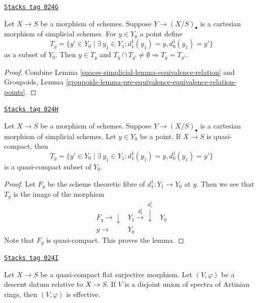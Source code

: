 \begin{lemma}
\label{spaces-simplicial-lemma-equivalence-classes-points}
\href{https://stacks.math.columbia.edu/tag/024G}{\texttt{Stacks tag 024G}}

Let $X \to S$ be a morphism of schemes. Suppose $Y \to (X/S)_\bullet$
is a cartesian morphism of simplicial schemes. For $y \in Y_0$ a point define
$$
T_y = \{y' \in Y_0 \mid \exists\ y_1 \in Y_1:
d^1_1(y_1) = y, d^1_0(y_1) = y'\}
$$
as a subset of $Y_0$. Then $y \in T_y$ and
$T_y \cap T_{y'} \not = \emptyset \Rightarrow T_y = T_{y'}$.
\end{lemma}

\begin{proof}
Combine Lemma \ref{spaces-simplicial-lemma-equivalence-relation} and
Groupoids, Lemma
\ref{groupoids-lemma-pre-equivalence-equivalence-relation-points}.
\end{proof}

\begin{lemma}
\label{spaces-simplicial-lemma-quasi-compact}
\href{https://stacks.math.columbia.edu/tag/024H}{\texttt{Stacks tag 024H}}

Let $X \to S$ be a morphism of schemes.
Suppose $Y \to (X/S)_\bullet$ is a cartesian morphism of simplicial schemes.
Let $y \in Y_0$ be a point. If $X \to S$ is quasi-compact, then
$$
T_y = \{y' \in Y_0 \mid \exists\ y_1 \in Y_1:
d^1_1(y_1) = y, d^1_0(y_1) = y'\}
$$
is a quasi-compact subset of $Y_0$.
\end{lemma}

\begin{proof}
Let $F_y$ be the scheme theoretic fibre of $d^1_1 : Y_1 \to Y_0$
at $y$. Then we see that $T_y$ is the image of the morphism
$$
\begin{array}{ccc}F_y \longrightarrow\downarrow & Y_1 \overset{d^1_0}{\longrightarrow}\overset{d^1_1}{\downarrow} & Y_0 \\ y \longrightarrow & Y_0 & \end{array}
$$
Note that $F_y$ is quasi-compact. This proves the lemma.
\end{proof}

\begin{lemma}
\label{spaces-simplicial-lemma-descent-disjoint-union-Artinian-along-fields}
\href{https://stacks.math.columbia.edu/tag/024I}{\texttt{Stacks tag 024I}}

Let $X \to S$ be a quasi-compact flat surjective morphism.
Let $(V, \varphi)$ be a descent datum relative
to $X \to S$. If $V$ is a disjoint union of
spectra of Artinian rings, then $(V, \varphi)$ is effective.
\end{lemma}


